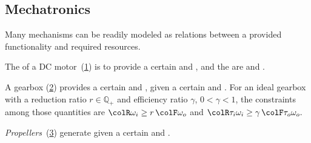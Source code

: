 \subsection{Mechatronics}


Many mechanisms can be readily modeled as relations between a provided
functionality and required resources.


\begin{example}
  The  of a DC motor~(\cref{fig:dc_motor})
  is to provide a certain  and , and the 
  are  and .
\end{example}

\begin{figure}[h]
  \begin{center}
  \end{center}
  \caption{\label{fig:dc_motor}}
\end{figure}


\begin{example}
  A gearbox (\cref{fig:gearbox}) provides a certain  and , given a certain
   and . For
  an ideal gearbox with a reduction ratio $r \in \mathbb{Q}_+$ and
  efficiency ratio $\gamma$, $0<\gamma<1$, the constraints among
  those quantities are ${\colR \omega_i}\geq r\,{\colF \omega_o}$
  and ${\colR \tau_i\omega_i}\geq\gamma\,{\colF \tau_o\omega_o}.$
\end{example}

\begin{figure}[h]
  \begin{center}
  \end{center}
  \caption{\label{fig:gearbox}}
\end{figure}


\begin{example}
  \emph{Propellers}~(\cref{fig:propeller}) generate 
  given a certain  and .
\end{example}

\begin{figure}[h]
  \begin{center}
  \end{center}
  \caption{\label{fig:propeller}}
\end{figure}


